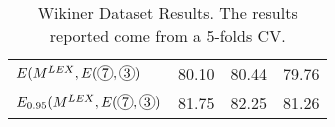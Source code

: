 \begin{table*}[]
\begin{tabular}{@{\makebox[2.5em][l]{\rownumber\space}}llll@{}}
\midrule
%
$E(M^{LEX}, E(\circlednumber{7}, \circlednumber{3})$       & 80.10          & 80.44           & 79.76         \\
$E_{0.95}(M^{LEX}, E(\circlednumber{7}, \circlednumber{3})$       & 81.75          & 82.25           & 81.26         \\



\bottomrule
\end{tabular}
\caption{Wikiner Dataset Results. The results reported come from a 5-folds CV.}
\label{tab:wikigold}
\end{table*}
\def\rownumber{}
